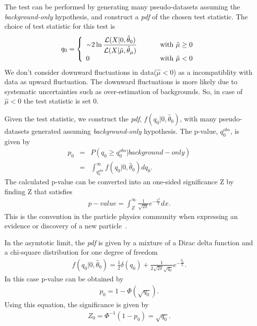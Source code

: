 The test can be performed by generating many pseudo-datasets assuming the 
\textit{background-only} hypothesis, and construct a \textit{pdf} 
of the chosen test statistic. The choice of test statistic for 
this test is  
\begin{eqnarray} 
q_0
=
\left\{ \begin{array}{l l}
\displaystyle
-2 \ln \frac{\mathcal{L}( X | 0, \hat{\theta}_0)}
            {\mathcal{L}( X | \hat{\mu}, \hat{\theta}_\mu)} 
             & \qquad \textrm{ with } \hat{\mu} \ge 0 \\   
0 
             & \qquad \textrm{ with } \hat{\mu} < 0    
\end{array} \right.
\end{eqnarray} 
We don't consider downward fluctuations in data($\hat{\mu} < 0$) as a 
incompatiblity with data as upward fluctuation. The downward fluctuations 
is more likely due to systematic uncertainties such as over-estimation 
of backgrounds. So, in case of $\hat{\mu} < 0$ the test statistic is 
set 0. 

Given the test statistic, we construct the \textit{pdf}, $f(q_0|0,\hat{\theta}_0)$, 
with many pseudo-datasets generated assuming \textit{background-only} hypothesis.
The p-value, $q_0^{obs}$, is given by 
\begin{eqnarray} 
p_0
&=& P \left( q_0 \ge q_0^{obs} | background-only \right)  \\
&=& \int^{\infty}_{ q_0^{obs} }  f\left( q_0 | 0, \hat{\theta}_0 \right) dq_0.
\end{eqnarray} 
The calculated p-value can be converted into an one-sided%
significance Z by finding Z that satisfies 
\begin{eqnarray} 
p-value 
= 
\int^{\infty}_{Z} \frac{1}{\sqrt{2\pi}} e^{ -\frac{x^2}{2}} dx.   
\end{eqnarray} 
This is the convention in the particle physics community 
when expressing an evidence or discovery of a new particle~\cite{Beringer:1900zz}.

In the asymtotic limit, the \textit{pdf} is given by a mixture of 
a Dirac delta function and a chi-square distribution for one 
degree of freedom~\cite{combination_stat}
\begin{eqnarray} 
f\left(q_0 | 0, \hat{\theta}_0 \right) 
= 
\frac{1}{2} \delta \left(q_0\right)  
+ 
\frac{1}{2\sqrt{2\pi}\sqrt{q_0}} e^{-\frac{q_0}{2}}.
\end{eqnarray}
In this case p-value can be obtained by 
\begin{eqnarray}
p_0 = 1 - \Phi \left( \sqrt{q_0} \right).
\end{eqnarray} 
Using this equation, the significance is given by  
\begin{eqnarray} 
Z_0 = \Phi^{-1} \left( 1 - p_0 \right) = \sqrt{q_0}.
\end{eqnarray} 

